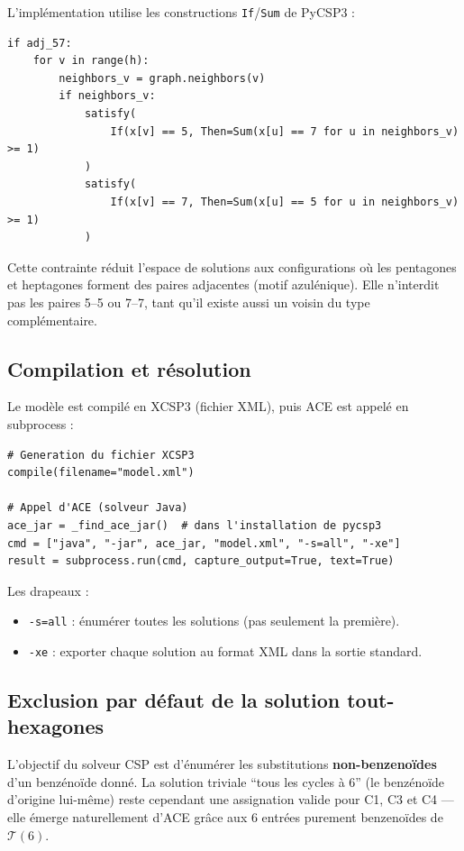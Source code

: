 L'implémentation utilise les constructions \texttt{If}/\texttt{Sum} de PyCSP3 :

\begin{lstlisting}
if adj_57:
    for v in range(h):
        neighbors_v = graph.neighbors(v)
        if neighbors_v:
            satisfy(
                If(x[v] == 5, Then=Sum(x[u] == 7 for u in neighbors_v) >= 1)
            )
            satisfy(
                If(x[v] == 7, Then=Sum(x[u] == 5 for u in neighbors_v) >= 1)
            )
\end{lstlisting}

\begin{remarque}
  Cette contrainte réduit l'espace de solutions aux configurations où les pentagones et
  heptagones forment des paires adjacentes (motif azulénique). Elle n'interdit pas les
  paires 5--5 ou 7--7, tant qu'il existe aussi un voisin du type complémentaire.
\end{remarque}

\subsection{Compilation et résolution}

Le modèle est compilé en XCSP3 (fichier XML), puis ACE est appelé en subprocess :

\begin{lstlisting}
# Generation du fichier XCSP3
compile(filename="model.xml")

# Appel d'ACE (solveur Java)
ace_jar = _find_ace_jar()  # dans l'installation de pycsp3
cmd = ["java", "-jar", ace_jar, "model.xml", "-s=all", "-xe"]
result = subprocess.run(cmd, capture_output=True, text=True)
\end{lstlisting}

Les drapeaux :
\begin{itemize}
  \item \texttt{-s=all} : énumérer toutes les solutions (pas seulement la première).
  \item \texttt{-xe} : exporter chaque solution au format XML dans la sortie standard.
\end{itemize}

\subsection{Exclusion par défaut de la solution tout-hexagones}


L'objectif du solveur CSP est d'énumérer les substitutions \textbf{non-benzenoïdes}
d'un benzénoïde donné. La solution triviale ``tous les cycles à 6'' (le benzénoïde
d'origine lui-même) reste cependant une assignation valide pour C1, C3 et C4 — elle
émerge naturellement d'ACE grâce aux 6 entrées purement benzenoïdes de
$\mathcal{T}(6)$.

